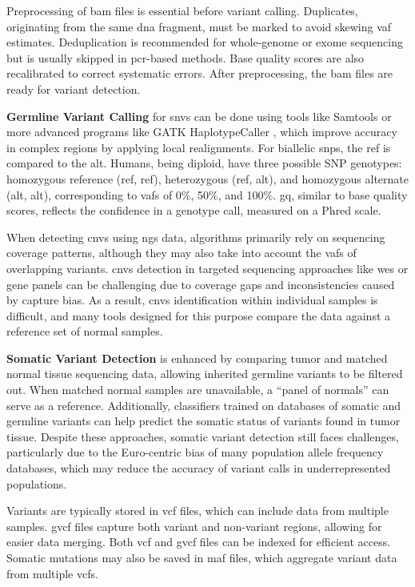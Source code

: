 Preprocessing of \ac{bam} files is essential before variant calling. Duplicates, originating from the same \ac{dna} fragment, must be marked to avoid skewing \ac{vaf} estimates. Deduplication is recommended for whole-genome or exome sequencing but is usually skipped in \ac{pcr}-based methods. Base quality scores are also recalibrated to correct systematic errors. After preprocessing, the \ac{bam} files are ready for variant detection. \cite{Larson2023}

\textbf{Germline Variant Calling} for \ac{snvs} can be done using tools like Samtools \cite{samtools} or more advanced programs like GATK HaplotypeCaller \cite{GATK2023}, which improve accuracy in complex regions by applying local realignments. For biallelic \ac{snps}, the \ac{ref} is compared to the \ac{alt}. Humans, being diploid, have three possible SNP genotypes: homozygous reference (\ac{ref}, \ac{ref}), heterozygous (\ac{ref}, \ac{alt}), and homozygous alternate (\ac{alt}, \ac{alt}), corresponding to \ac{vaf}s of 0\%, 50\%, and 100\%. \ac{gq}, similar to base quality scores, reflects the confidence in a genotype call, measured on a Phred scale. \cite{Larson2023}

When detecting \ac{cnvs} using \ac{ngs} data, algorithms primarily rely on sequencing coverage patterns, although they may also take into account the \ac{vaf}s of overlapping variants. \ac{cnvs} detection in targeted sequencing approaches like \ac{wes} or gene panels can be challenging due to coverage gaps and inconsistencies caused by capture bias. As a result, \ac{cnvs} identification within individual samples is difficult, and many tools designed for this purpose compare the data against a reference set of normal samples. \cite{Larson2023}

\textbf{Somatic Variant Detection} is enhanced by comparing tumor and matched normal tissue sequencing data, allowing inherited germline variants to be filtered out. When matched normal samples are unavailable, a “panel of normals” can serve as a reference. Additionally, classifiers trained on databases of somatic and germline variants can help predict the somatic status of variants found in tumor tissue. Despite these approaches, somatic variant detection still faces challenges, particularly due to the Euro-centric bias of many population allele frequency databases, which may reduce the accuracy of variant calls in underrepresented populations. \cite{Larson2023}

Variants are typically stored in \ac{vcf} files, which can include data from multiple samples. \ac{gvcf} files capture both variant and non-variant regions, allowing for easier data merging. Both \ac{vcf} and \ac{gvcf} files can be indexed for efficient access. Somatic mutations may also be saved in \ac{maf} files, which aggregate variant data from multiple \ac{vcf}s. \cite{Larson2023}

